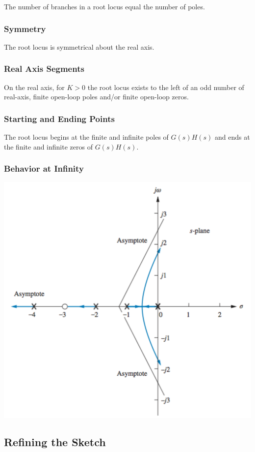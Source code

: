\documentclass[11pt]{article}
\begin{document}
    The number of branches in a root locus equal the number of poles.

    \subsubsection{Symmetry}

    The root locus is symmetrical about the real axis.

    \subsubsection{Real Axis Segments}

    On the real axis, for $K > 0$ the root locus exists to the left of an odd number of real-axis, finite open-loop poles and/or finite open-loop zeros.

    \subsubsection{Starting and Ending Points}

    The root locus begins at the finite and infinite poles of $G(s)H(s)$ and ends at the finite and infinite zeros of $G(s)H(s)$.

    \subsubsection{Behavior at Infinity}

    \begin{center}
    \includegraphics[width=300 px]{img/asymptotes} \\
    \end{center}

    \subsection{Refining the Sketch}
\end{document}
